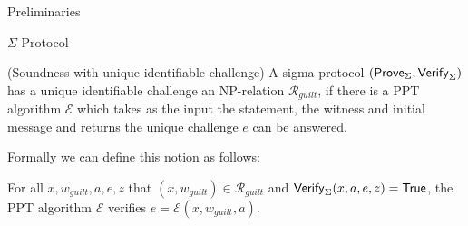 % 
% 
% 
% 
\begin{section}{Preliminaries}
  \begin{definition}{$\Sigma$-Protocol}
  \end{definition}


  \begin{definition}{\textsf(Soundness with unique identifiable challenge)}
    A sigma protocol $({\mathsf{Prove}}_{\Sigma}, {\mathsf{Verify}}_{\Sigma})$ has a unique identifiable challenge \wrt an NP-relation $\mathcal{R}_{guilt}$, if there is a PPT algorithm $\mathcal{E}$ which takes as the input the statement, the witness and initial message and returns the unique challenge $e$ can be answered.

    Formally we can define this notion as follows:
    
    For all $x, w_{guilt}, a, e, z$ that $(x, w_{guilt}) \in \mathcal{R}_{guilt}$ and ${\mathsf{Verify}}_{\Sigma}(x, a, e, z) = \mathsf{True}$, the PPT algorithm $\mathcal{E}$ verifies $e = \mathcal{E}(x, w_{guilt}, a)$.
    
  \end{definition}
\end{section}

